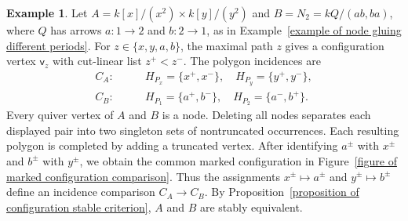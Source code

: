 \documentclass[11pt]{article}
\newcommand{\vv}{\mathsf{v}}
\theoremstyle{definition}
\newtheorem{example}[theorem]{Example}
\begin{document}
		\begin{example}\label{example of marked ribbon comparison}
			Let $A=k[x]/(x^2)\times k[y]/(y^2)$ and $B=N_2=kQ/(ab,ba)$, where $Q$ has arrows $a:1\to2$ and $b:2\to1$, as in Example~\ref{example of node gluing different periods}. For $z\in\{x,y,a,b\}$, the maximal path $z$ gives a configuration vertex $\vv_z$ with cut-linear list $z^+<z^-$. The polygon incidences are
			\[
				\begin{aligned}
					C_A:&\qquad H_{P_x}=\{x^+,x^-\},\quad
					H_{P_y}=\{y^+,y^-\},\\
					C_B:&\qquad H_{P_1}=\{a^+,b^-\},\quad
					H_{P_2}=\{a^-,b^+\}.
				\end{aligned}
			\]
			Every quiver vertex of $A$ and $B$ is a node. Deleting all nodes separates each displayed pair into two singleton sets of nontruncated occurrences. Each resulting polygon is completed by adding a truncated vertex. After identifying $a^\pm$ with $x^\pm$ and $b^\pm$ with $y^\pm$, we obtain the common marked configuration in Figure~\ref{figure of marked configuration comparison}.
			Thus the assignments $x^\pm\mapsto a^\pm$ and $y^\pm\mapsto b^\pm$ define an incidence comparison $C_A\to C_B$. By Proposition~\ref{proposition of configuration stable criterion}, $A$ and $B$ are stably equivalent.


\end{example}
\end{document}
